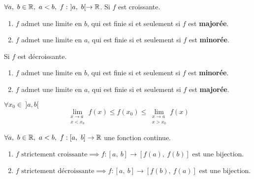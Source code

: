 \begin{theorem}
	$\forall a,\ b \in \R,\ a < b,\ f :\ ]a,\ b[ \to \R$. 
	Si $f$ est croissante.
	\begin{enumerate}
		\item $f$ admet une limite en $b$, qui est finie si et seulement si $f$ est \textbf{majorée}.
		\item $f$ admet une limite en $a$, qui est finie si et seulement si $f$ est \textbf{minorée}.
	\end{enumerate}
	Si $f$ est décroissante.
	\begin{enumerate}
		\item $f$ admet une limite en $b$, qui est finie si et seulement si $f$ est \textbf{minorée}.
		\item $f$ admet une limite en $a$, qui est finie si et seulement si $f$ est \textbf{majorée}.
	\end{enumerate}
	$\forall x_0 \in \ ]a, b[$
	\[ \lim_{\substack{x \to a \\ x < x_0}} f(x) \leq f(x_0) \leq \lim_{\substack{x \to a \\ x > x_0}} f(x) \]
\end{theorem}

\begin{theorem}
	$\forall a,\ b \in \R,\ a < b,\ f : [a,\ b] \to \R$ une fonction continue.
	\begin{enumerate}
	    \item $ f \text{ strictement croissante} \implies f : [a,\ b] \to [f(a),\ f(b)] \text{ est une bijection} $.
            \item $ f \text{ strictement décroissante} \implies f : [a,\ b] \to [f(b),\ f(a)] \text{ est une bijection} $.
	\end{enumerate}
\end{theorem}